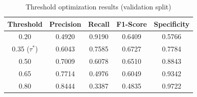 \documentclass[fleqn,10pt]{wlscirep}
\begin{document}
\begin{table}[htbp]
\centering
\caption{Threshold optimization results (validation split)}
\label{tab:theshold_result}
\begin{tabular}{ccccc}
\toprule
Threshold & Precision & Recall & F1-Score & Specificity \\
\midrule
0.20 & 0.4920 & 0.9190 & 0.6409 & 0.5766 \\
0.35 ($\tau^*$) & 0.6043 & 0.7585 & 0.6727 & 0.7784 \\
0.50 & 0.7009 & 0.6078 & 0.6510 & 0.8843 \\
0.65 & 0.7714 & 0.4976 & 0.6049 & 0.9342 \\
0.80 & 0.8444 & 0.3387 & 0.4835 & 0.9722 \\
\bottomrule
\end{tabular}
\end{table}
\end{document}
